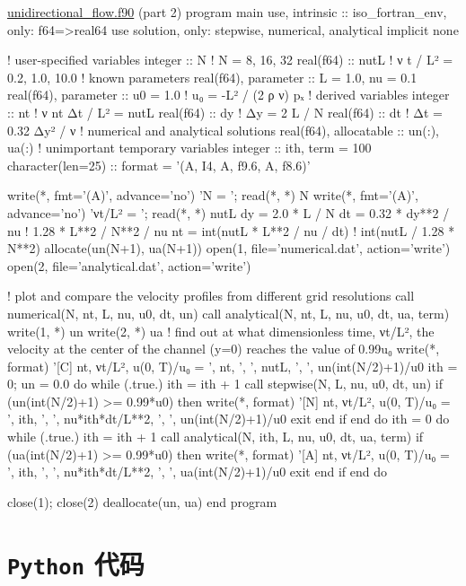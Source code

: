 \begin{fortran}[label={C:2-2-2}]{\href{https://github.com/iydon/CFDRust/blob/main/mae5005/code/2/unidirectional_flow.f90}{unidirectional\_flow.f90} (part 2)}
program main
   use, intrinsic :: iso_fortran_env, only: f64=>real64
   use solution, only: stepwise, numerical, analytical
   implicit none

   ! user-specified variables
   integer :: N ! N = 8, 16, 32
   real(f64) :: nutL ! ν t / L² = 0.2, 1.0, 10.0
   ! known parameters
   real(f64), parameter :: L = 1.0, nu = 0.1
   real(f64), parameter :: u0 = 1.0 ! u₀ = -L² / (2 ρ ν) pₓ
   ! derived variables
   integer :: nt ! ν nt Δt / L² = nutL
   real(f64) :: dy ! Δy = 2 L / N
   real(f64) :: dt ! Δt = 0.32 Δy² / ν
   ! numerical and analytical solutions
   real(f64), allocatable :: un(:), ua(:)
   ! unimportant temporary variables
   integer :: ith, term = 100
   character(len=25) :: format = '(A, I4, A, f9.6, A, f8.6)'

   write(*, fmt='(A)', advance='no') 'N     = '; read(*, *) N
   write(*, fmt='(A)', advance='no') 'νt/L² = '; read(*, *) nutL
   dy = 2.0 * L / N
   dt = 0.32 * dy**2 / nu ! 1.28 * L**2 / N**2 / nu
   nt = int(nutL * L**2 / nu / dt) ! int(nutL / 1.28 * N**2)
   allocate(un(N+1), ua(N+1))
   open(1, file='numerical.dat', action='write')
   open(2, file='analytical.dat', action='write')

   ! plot and compare the velocity profiles from different grid resolutions
   call numerical(N, nt, L, nu, u0, dt, un)
   call analytical(N, nt, L, nu, u0, dt, ua, term)
   write(1, *) un
   write(2, *) ua
   ! find out at what dimensionless time, νt/L², the velocity at the center of the channel (y=0) reaches the value of 0.99u₀
   write(*, format) '[C] nt, νt/L², u(0, T)/u₀ = ', nt, ', ', nutL, ', ', un(int(N/2)+1)/u0
   ith = 0; un = 0.0
   do while (.true.)
      ith = ith + 1
      call stepwise(N, L, nu, u0, dt, un)
      if (un(int(N/2)+1) >= 0.99*u0) then
         write(*, format) '[N] nt, νt/L², u(0, T)/u₀ = ', ith, ', ', nu*ith*dt/L**2, ', ', un(int(N/2)+1)/u0
         exit
      end if
   end do
   ith = 0
   do while (.true.)
      ith = ith + 1
      call analytical(N, ith, L, nu, u0, dt, ua, term)
      if (ua(int(N/2)+1) >= 0.99*u0) then
         write(*, format) '[A] nt, νt/L², u(0, T)/u₀ = ', ith, ', ', nu*ith*dt/L**2, ', ', ua(int(N/2)+1)/u0
         exit
      end if
   end do

   close(1); close(2)
   deallocate(un, ua)
end program
\end{fortran}



\section{\texttt{Python} 代码}\label{S:appendix-python}


